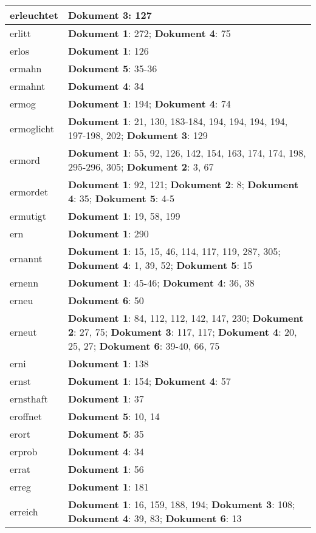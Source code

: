 \documentclass[a5paper]{article}
\begin{document}
\begin{longtable}[l]{|l|p{3in}|}
\hline
erleuchtet & \textbf{Dokument 3}: 127 \\
\hline
erlitt & \textbf{Dokument 1}: 272; \textbf{Dokument 4}: 75 \\
\hline
erlos & \textbf{Dokument 1}: 126 \\
\hline
ermahn & \textbf{Dokument 5}: 35-36 \\
\hline
ermahnt & \textbf{Dokument 4}: 34 \\
\hline
ermog & \textbf{Dokument 1}: 194; \textbf{Dokument 4}: 74 \\
\hline
ermoglicht & \textbf{Dokument 1}: 21, 130, 183-184, 194, 194, 194, 194, 197-198, 202; \textbf{Dokument 3}: 129 \\
\hline
ermord & \textbf{Dokument 1}: 55, 92, 126, 142, 154, 163, 174, 174, 198, 295-296, 305; \textbf{Dokument 2}: 3, 67 \\
\hline
ermordet & \textbf{Dokument 1}: 92, 121; \textbf{Dokument 2}: 8; \textbf{Dokument 4}: 35; \textbf{Dokument 5}: 4-5 \\
\hline
ermutigt & \textbf{Dokument 1}: 19, 58, 199 \\
\hline
ern & \textbf{Dokument 1}: 290 \\
\hline
ernannt & \textbf{Dokument 1}: 15, 15, 46, 114, 117, 119, 287, 305; \textbf{Dokument 4}: 1, 39, 52; \textbf{Dokument 5}: 15 \\
\hline
ernenn & \textbf{Dokument 1}: 45-46; \textbf{Dokument 4}: 36, 38 \\
\hline
erneu & \textbf{Dokument 6}: 50 \\
\hline
erneut & \textbf{Dokument 1}: 84, 112, 112, 142, 147, 230; \textbf{Dokument 2}: 27, 75; \textbf{Dokument 3}: 117, 117; \textbf{Dokument 4}: 20, 25, 27; \textbf{Dokument 6}: 39-40, 66, 75 \\
\hline
erni & \textbf{Dokument 1}: 138 \\
\hline
ernst & \textbf{Dokument 1}: 154; \textbf{Dokument 4}: 57 \\
\hline
ernsthaft & \textbf{Dokument 1}: 37 \\
\hline
eroffnet & \textbf{Dokument 5}: 10, 14 \\
\hline
erort & \textbf{Dokument 5}: 35 \\
\hline
erprob & \textbf{Dokument 4}: 34 \\
\hline
errat & \textbf{Dokument 1}: 56 \\
\hline
erreg & \textbf{Dokument 1}: 181 \\
\hline
erreich & \textbf{Dokument 1}: 16, 159, 188, 194; \textbf{Dokument 3}: 108; \textbf{Dokument 4}: 39, 83; \textbf{Dokument 6}: 13 \\

\end{longtable}
\end{document}
